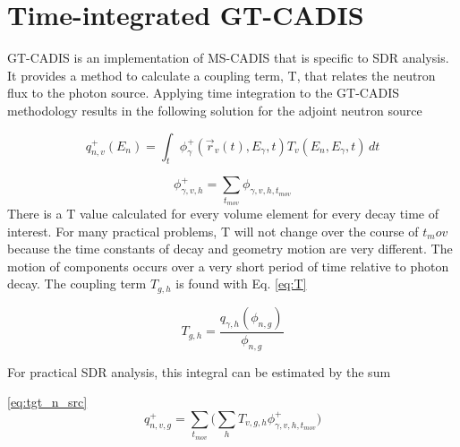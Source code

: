 \section{Time-integrated GT-CADIS}
GT-CADIS is an implementation of MS-CADIS that is specific to SDR analysis.  It
provides a method to calculate a coupling term, T, that relates the neutron
flux to the photon source.
Applying time integration to the GT-CADIS methodology results in the following
solution for the adjoint neutron source

 \begin{equation}\label{eq:adj_src_1_avg}
	 q_{n,v}^{+}(E_{n}) =
	 \int_{t}     \phi_{\gamma}^{+}(\overrightarrow{r}_{v}(t), E_{\gamma},t)
	 T_{v}(E_n, E_{\gamma}, t)\, dt
 \end{equation}

\begin{equation}\label{eq:sum}
	\phi_{\gamma,v, h}^{+} = \sum_{t_{mov}}{\phi_{\gamma,v,h,t_{mov}}}
\end{equation}
 There is a T value calculated for every volume element for every decay time of
 interest.  For many practical problems, T will not change over the course of
 $t_mov$  because the time constants of decay and geometry
 motion are very different.  The motion of components occurs over a very short
 period of time relative to photon decay.  
The coupling term $T_{g,h}$ is found with Eq.
\ref{eq:T}

\begin{equation}\label{eq:T}
	T_{g,h} = \dfrac{q_{\gamma, h}(\phi_{n,g})}{\phi_{n,g}}
\end{equation}

For practical SDR analysis, this integral can be estimated by the sum
 
\ref{eq:tgt_n_src}
\begin{equation}\label{eq:tgt_n_src}
	q_{n,v,g}^{+} =
	\sum_{t_{mov}}\Bigg(\sum_{h} T_{v,g,h} \phi_{\gamma,v,h,t_{mov}}^{+}\Bigg)
\end{equation}
